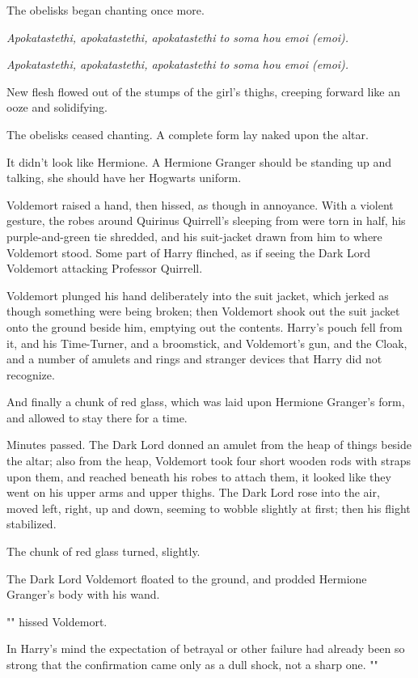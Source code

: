 The obelisks began chanting once more.

\emph{Apokatastethi, apokatastethi, apokatastethi to soma hou emoi (emoi).}

\emph{Apokatastethi, apokatastethi, apokatastethi to soma hou emoi (emoi).}

New flesh flowed out of the stumps of the girl's thighs, creeping forward like
an ooze and solidifying.

The obelisks ceased chanting. A complete form lay naked upon the altar.

It didn't look like Hermione. A Hermione Granger should be standing up and
talking, she should have her Hogwarts uniform.

Voldemort raised a hand, then hissed, as though in annoyance. With a violent
gesture, the robes around Quirinus Quirrell's sleeping from were torn in half,
his purple-and-green tie shredded, and his suit-jacket drawn from him to where
Voldemort stood. Some part of Harry flinched, as if seeing the Dark Lord
Voldemort attacking Professor Quirrell.

Voldemort plunged his hand deliberately into the suit jacket, which jerked as
though something were being broken; then Voldemort shook out the suit jacket
onto the ground beside him, emptying out the contents. Harry's pouch fell from
it, and his Time-Turner, and a broomstick, and Voldemort's gun, and the Cloak,
and a number of amulets and rings and stranger devices that Harry did not
recognize.

And finally a chunk of red glass, which was laid upon Hermione Granger's form,
and allowed to stay there for a time.

Minutes passed. The Dark Lord donned an amulet from the heap of things beside
the altar; also from the heap, Voldemort took four short wooden rods with
straps upon them, and reached beneath his robes to attach them, it looked like
they went on his upper arms and upper thighs. The Dark Lord rose into the air,
moved left, right, up and down, seeming to wobble slightly at first; then his
flight stabilized.

The chunk of red glass turned, slightly.

The Dark Lord Voldemort floated to the ground, and prodded Hermione Granger's
body with his wand.

"" hissed Voldemort.

In Harry's mind the expectation of betrayal or other failure had already been
so strong that the confirmation came only as a dull shock, not a sharp one.
""

